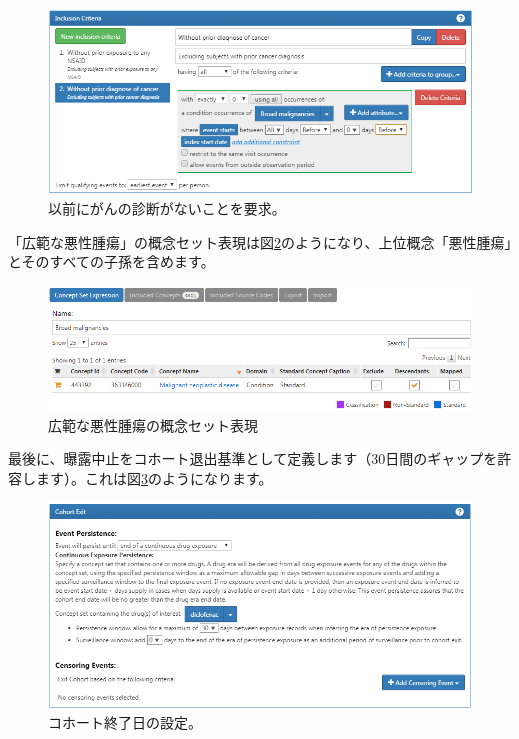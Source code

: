 \documentclass[
  11pt]{book}
\theoremstyle{definition}
\theoremstyle{definition}
\theoremstyle{definition}
\theoremstyle{definition}
\theoremstyle{remark}
\begin{document}
\begin{figure}

{\centering \includegraphics[width=1\linewidth]{images/SuggestedAnswers/cohortsAtlasInclusion2} 

}

\caption{以前にがんの診断がないことを要求。}\label{fig:cohortsAtlasInclusion2}
\end{figure}

「広範な悪性腫瘍」の概念セット表現は図\ref{fig:cohortsAtlasConceptSet3}のようになり、上位概念「悪性腫瘍」とそのすべての子孫を含めます。

\begin{figure}

{\centering \includegraphics[width=1\linewidth]{images/SuggestedAnswers/cohortsAtlasConceptSet3} 

}

\caption{広範な悪性腫瘍の概念セット表現}\label{fig:cohortsAtlasConceptSet3}
\end{figure}

最後に、曝露中止をコホート退出基準として定義します（30日間のギャップを許容します）。これは図\ref{fig:cohortsAtlasExit}のようになります。

\begin{figure}

{\centering \includegraphics[width=1\linewidth]{images/SuggestedAnswers/cohortsAtlasExit} 

}

\caption{コホート終了日の設定。}\label{fig:cohortsAtlasExit}
\end{figure}
\end{document}
